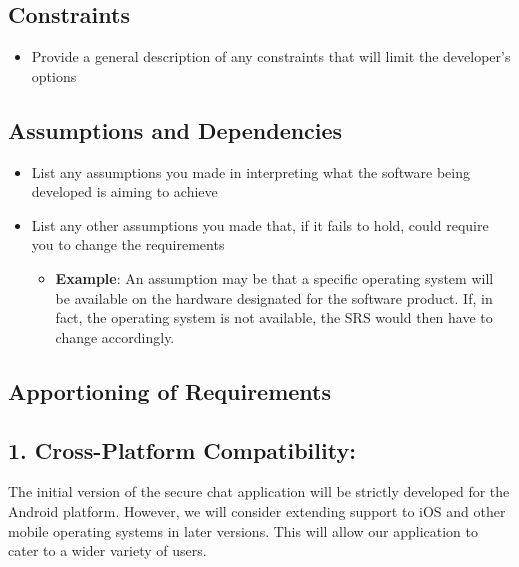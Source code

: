 \documentclass[]{article}
\begin{document}
\subsection{Constraints}
\label{sub:constraints}
\begin{itemize}
	\item Provide a general description of any constraints that will limit the developer's options
\end{itemize}

\subsection{Assumptions and Dependencies}
\label{sub:assumptions_and_dependencies}
\begin{itemize}
	\item List any assumptions you made in interpreting what the software being developed is aiming to achieve
	\item List any other assumptions you made that, if it fails to hold, could require you to change the requirements
	      \begin{itemize}
		      \item \textbf{Example}: An assumption may be that a specific operating system will be available on the hardware designated for the software product. If, in fact, the operating system is not available, the SRS would then have to change accordingly.
	      \end{itemize}
\end{itemize}

\subsection{Apportioning of Requirements}
\label{sub:apportioning_of_requirements}
\subsection*{1. Cross-Platform Compatibility:}
The initial version of the secure chat application will be strictly developed for the Android platform. However, we will consider extending support to iOS and other mobile operating systems in later versions. This will allow our application to cater to a wider variety of users.
\end{document}
